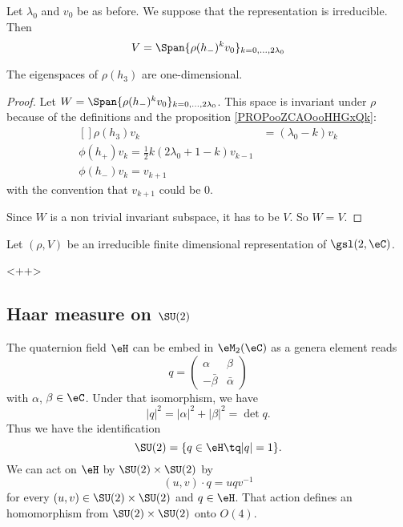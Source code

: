 \begin{proposition}
    Let \( \lambda_0\) and \( v_0\) be as before. We suppose that the representation is irreducible. Then
    \begin{equation}
        V=\Span\{  \rho(h_-)^kv_0 \}_{k=0,\ldots, 2\lambda_0}
    \end{equation}

    The eigenspaces of \( \rho(h_3)\) are one-dimensional.
\end{proposition}

\begin{proof}
    Let \(  W=\Span\{  \rho(h_-)^kv_0 \}_{k=0,\ldots, 2\lambda_0}\). This space is invariant under \( \rho\) because of the definitions and the proposition \ref{PROPooZCAOooHHGxQk}:
    \begin{equation}
        \begin{aligned}[]
            \rho(h_3)v_k&=(\lambda_0-k)v_k\\
            \phi(h_+)v_k=\frac{ 1 }{2}k(2\lambda_0+1-k)v_{k-1}\\
            \phi(h_-)v_k=v_{k+1}
        \end{aligned}
    \end{equation}
    with the convention that \( v_{k+1}\) could be \( 0\).   

    Since \( W\) is a non trivial invariant subspace, it has to be \( V\). So \( W=V\).
\end{proof}

\begin{theorem}
    Let \( (\rho,V)\) be an irreducible finite dimensional representation of \( \gsl(2,\eC)\).
\end{theorem}
<++>

					\subsection{Haar measure on \texorpdfstring{$\SU(2)$}{SU2}}

The quaternion field $\eH$ can be embed in $\eM_2(\eC)$ as a genera element reads
\begin{equation}
	q=
\begin{pmatrix}
  \alpha	&	\beta	\\
  -\bar\beta	&	\bar\alpha
\end{pmatrix}
\end{equation}
with $\alpha$, $\beta\in\eC$. Under that isomorphism, we have
\[
	| q |^2=| \alpha |^2+| \beta |^2=\det q.
\]
Thus we have the identification
\begin{equation}
	\SU(2)=\{ q\in\eH\tq | q |=1 \}.
\end{equation}
We can act on $\eH$ by $\SU(2)\times \SU(2)$ by
\begin{equation}
	(u,v)\cdot q=uqv^{-1}
\end{equation}
for every $(u,v)\in \SU(2)\times\SU(2)$ and $q\in\eH$. That action defines an homomorphism from $\SU(2)\times\SU(2)$ onto $O(4)$.

